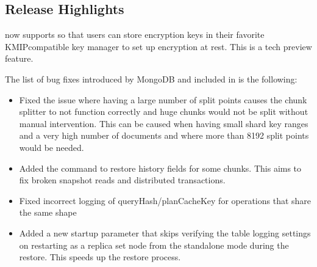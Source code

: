 \documentclass[letterpaper,10pt,english]{sphinxmanual}
\begin{document}
\subsection{Release Highlights}
\label{\detokenize{release_notes/4.4.13-13:release-highlights}}
\sphinxAtStartPar
{} now supports {\hyperref[\detokenize{kmip:kmip}]{}} so that users can store encryption keys in their favorite KMIP\sphinxhyphen{}compatible key manager to set up encryption at rest. This is a tech preview feature.

\sphinxAtStartPar
The list of bug fixes introduced by MongoDB and included in  is the following:
\begin{itemize}
\item {} 
\sphinxAtStartPar
{} \sphinxhyphen{} Fixed the issue where having a large number of split points causes the chunk splitter to not function correctly and huge chunks would not be split without manual intervention. This can be caused when having small shard key ranges and a very high number of documents and where more than 8192 split points would be needed.

\item {} 
\sphinxAtStartPar
{} \sphinxhyphen{} Added the  command to restore history fields for some chunks. This aims to fix broken snapshot reads and distributed transactions.

\item {} 
\sphinxAtStartPar
{} \sphinxhyphen{} Fixed incorrect logging of queryHash/planCacheKey for operations that share the same  shape

\item {} 
\sphinxAtStartPar
{} \sphinxhyphen{} Added a new startup parameter that skips verifying the table logging settings on restarting as a replica set node from the standalone mode during the restore. This speeds up the restore process.

\end{itemize}
\end{document}

